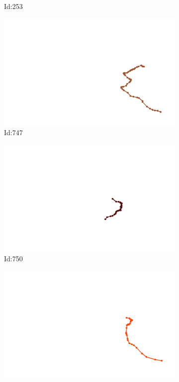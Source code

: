 \documentclass[12pt,twoside]{report}
\begin{document}
\begin{figure}
\begin{subfigure}[b]{0.20\textwidth}
\caption{Id:253}
\end{subfigure}
\begin{subfigure}[b]{0.20\textwidth}
\centering
\includegraphics[width=\textwidth]{../../trajectories/747.png}
\caption{Id:747}
\end{subfigure}
\begin{subfigure}[b]{0.20\textwidth}
\centering
\includegraphics[width=\textwidth]{../../trajectories/750.png}
\caption{Id:750}
\end{subfigure}
\begin{subfigure}[b]{0.20\textwidth}
\centering
\includegraphics[width=\textwidth]{../../trajectories/891.png}

\end{subfigure}
\end{figure}
\end{document}
